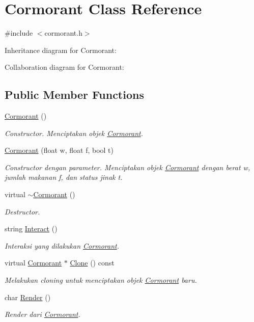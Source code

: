 \hypertarget{classCormorant}{}\section{Cormorant Class Reference}
\label{classCormorant}


{\ttfamily \#include $<$cormorant.\+h$>$}



Inheritance diagram for Cormorant\+:


Collaboration diagram for Cormorant\+:
\subsection*{Public Member Functions}
\begin{DoxyCompactItemize}
\item 
\hyperlink{classCormorant_a1c93b60af03db473c444783df366a2ae}{Cormorant} ()
\begin{DoxyCompactList}\small\item\em Constructor. Menciptakan objek \hyperlink{classCormorant}{Cormorant}. \end{DoxyCompactList}\item 
\hyperlink{classCormorant_a2a5c3053f29cb6c26f446ccc0982091b}{Cormorant} (float w, float f, bool t)
\begin{DoxyCompactList}\small\item\em Constructor dengan parameter. Menciptakan objek \hyperlink{classCormorant}{Cormorant} dengan berat w, jumlah makanan f, dan status jinak t. \end{DoxyCompactList}\item 
virtual \hyperlink{classCormorant_af24217c3b840dcf95b0961d68a241034}{$\sim$\+Cormorant} ()
\begin{DoxyCompactList}\small\item\em Destructor. \end{DoxyCompactList}\item 
string \hyperlink{classCormorant_af28984652ae999452d20aed885f0185a}{Interact} ()
\begin{DoxyCompactList}\small\item\em Interaksi yang dilakukan \hyperlink{classCormorant}{Cormorant}. \end{DoxyCompactList}\item 
virtual \hyperlink{classCormorant}{Cormorant} $\ast$ \hyperlink{classCormorant_a7be371562fab8ab5c2e9e72386ee9aa2}{Clone} () const 
\begin{DoxyCompactList}\small\item\em Melakukan cloning untuk menciptakan objek \hyperlink{classCormorant}{Cormorant} baru. \end{DoxyCompactList}\item 
char \hyperlink{classCormorant_a6d388885acfc98de6020a01b90259dac}{Render} ()
\begin{DoxyCompactList}\small\item\em Render dari \hyperlink{classCormorant}{Cormorant}. \end{DoxyCompactList}\end{DoxyCompactItemize}
